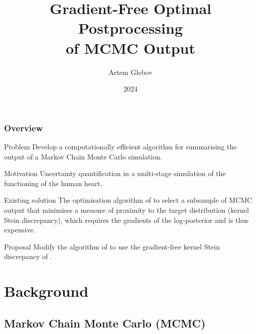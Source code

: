\documentclass{beamer}
\title[Gradient-Free Optimal Postprocessing]{Gradient-Free Optimal Postprocessing \\ of MCMC Output}
\author{Artem Glebov}
\institute{King's College London}
\date{2024}
\begin{document}
\frame{\titlepage}

\begin{frame}
\frametitle{Overview}

 \begin{block}{Problem}
	Develop a computationally efficient algorithm for summarising the output of a Markov Chain Monte Carlo simulation.
 \end{block}
 
 \bigskipamount
 
 \begin{block}{Motivation}
	Uncertainty quantification in a multi-stage simulation of the functioning of the human heart.
 \end{block}
 
 \bigskipamount
 
 \begin{block}{Existing solution}
	The optimisation algorithm of \cite{riabizOptimalThinningMCMC2022} to select a subsample of MCMC output that minimises a measure of proximity to the target distribution (kernel Stein discrepancy), which requires the gradients of the log-posterior and is thus expensive.
 \end{block}
 
 \bigskipamount
 
 \begin{block}{Proposal}
	Modify the algorithm of \cite{riabizOptimalThinningMCMC2022} to use the gradient-free kernel Stein discrepancy of \cite{fisherGradientFreeKernelStein2024}.
 \end{block}

\end{frame}



\section{Background}

\subsection{Markov Chain Monte Carlo (MCMC)}
\end{document}
